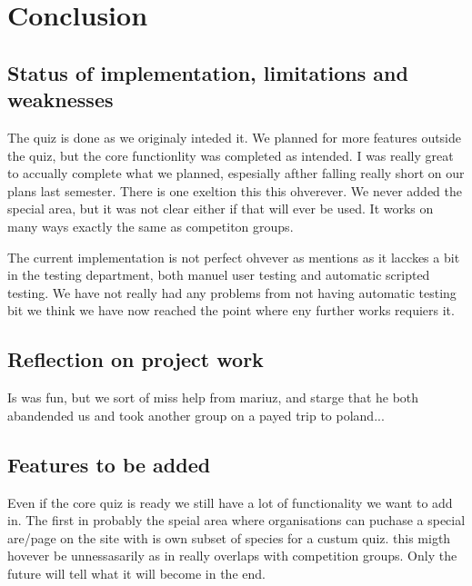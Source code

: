 \chapter{Conclusion}
\label{chap:conclusion}



\section{Status of implementation, limitations and weaknesses}
The quiz is done as we originaly inteded it. We planned for more features outside the quiz, but the core functionlity was completed as intended. I was really great to accually complete what we planned, espesially afther falling really short on our plans last semester. There is one exeltion this this ohverever. We never added the special area, but it was not clear either if that will ever be used. It works on many ways exactly the same as competiton groups.

The current implementation is not perfect ohvever as mentions as it lacckes a bit in the testing department, both manuel user testing and automatic scripted testing. We have not really had any problems from not having automatic testing bit we think we have now reached the point where eny further works requiers it.

\section{Reflection on project work}
Is was fun, but we sort of miss help from mariuz, and starge that he both abandended us and took another group on a payed trip to poland...


\section{Features to be added}
Even if the core quiz is ready we still have a lot of functionality we want to add in. The first in probably the speial area where organisations can puchase a special are/page on the site with is own subset of species for a custum quiz. this migth hovever be unnessasarily as in really overlaps with competition groups. Only the future will tell what it will become in the end.

